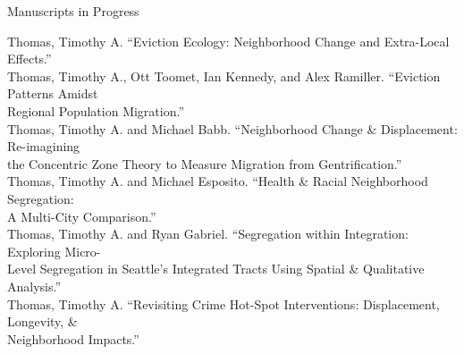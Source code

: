 \documentclass{resume} %
\begin{document}
%

\begin{rSection}{Manuscripts in Progress}
\vspace{5mm}

Thomas, Timothy A. ``Eviction Ecology: Neighborhood Change and Extra-Local Effects.''\\

Thomas, Timothy A., Ott Toomet, Ian Kennedy, and Alex Ramiller. ``Eviction Patterns Amidst\\ 
	\hspace*{.25in}Regional Population Migration.''\\

Thomas, Timothy A. and Michael Babb. ``Neighborhood Change \& Displacement: Re-imagining\\
\hspace*{.25in}the Concentric Zone Theory to Measure Migration from Gentrification.''\\


Thomas, Timothy A. and Michael Esposito. ``Health \& Racial Neighborhood Segregation: \\
\hspace*{.25in}A Multi-City Comparison.''\\

Thomas, Timothy A. and Ryan Gabriel. ``Segregation within Integration: Exploring Micro-\\
	\hspace*{.25in}Level Segregation in Seattle’s Integrated Tracts Using Spatial \& Qualitative Analysis.''\\

Thomas, Timothy A. ``Revisiting Crime Hot-Spot Interventions: Displacement, Longevity, \& \\
	\hspace*{.25in}Neighborhood Impacts.''
\vspace{5mm}
\end{rSection}

%
%
\end{document}

